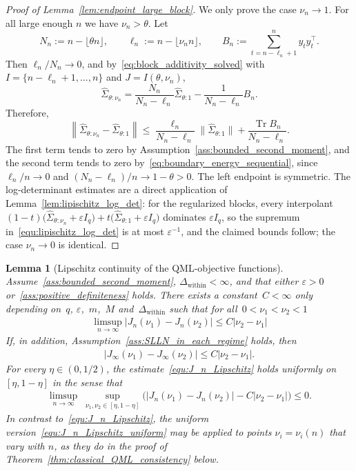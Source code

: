 \documentclass[10pt, letterpaper]{amsart}
\DeclareMathOperator{\Tr}{Tr}
\newtheorem{lem}[theorem]{Lemma}
\begin{document}
\begin{proof}[Proof of Lemma~\ref{lem:endpoint_large_block}]
We only prove the case $\nu_n\to1$. For all large enough $n$ we have $\nu_n>\theta$. Let
\[
N_n:=n-\lfloor \theta n\rfloor,\qquad
 \ell_n:=n-\lfloor \nu_n n\rfloor,
\qquad
B_n:=\sum_{t=n-\ell_n+1}^{n}y_t y_t^{\top}.
\]
Then $\ell_n/N_n\to0$, and  by~\eqref{eq:block_additivity_solved} with $I=\{n-\ell_n+1,\ldots,n\}$ and $J=I(\theta,\nu_n)$,
\[
\widehat\Sigma_{\theta:\nu_n}
=\frac{N_n}{N_n-\ell_n}\widehat\Sigma_{\theta:1}
-\frac{1}{N_n-\ell_n}B_n .
\]
Therefore,
\[
\left\|\widehat\Sigma_{\theta:\nu_n}-\widehat\Sigma_{\theta:1}\right\|
\leq
\frac{\ell_n}{N_n-\ell_n}\|\widehat\Sigma_{\theta:1}\|
+\frac{\Tr B_n}{N_n-\ell_n}.
\]
The first term tends to zero by Assumption~\ref{ass:bounded_second_moment}, and the second term tends to zero by~\eqref{eq:boundary_energy_sequential}, since $\ell_n/n\to0$ and $(N_n-\ell_n)/n\to1-\theta>0$. The left endpoint is symmetric.
The log-determinant estimates are a direct application of Lemma~\ref{lem:lipischitz_log_det}: for the regularized blocks, every interpolant $(1-t)\bigl(\widehat\Sigma_{\theta:\nu_n}+\varepsilon I_q\bigr)+t\bigl(\widehat\Sigma_{\theta:1}+\varepsilon I_q\bigr)$ dominates $\varepsilon I_q$, so the supremum in~\eqref{equ:lipischitz_log_det} is at most $\varepsilon^{-1}$, and the claimed bounds follow; the case $\nu_n\to0$ is identical.
\end{proof}

\begin{lem}[Lipschitz continuity of the QML-objective functions]\label{lem:Lipschitz_J}
Assume~\ref{ass:bounded_second_moment},
$\Delta_{\mathrm{within}}<\infty$, and that either $\varepsilon>0$
or~\ref{ass:positive_definiteness} holds.
There exists a constant~$C <\infty$ only depending on~$q$, $\varepsilon$,~$m$,~$M$ and~$\Delta_{\text{within}}$ such that for all~$0 < \nu_1 < \nu_2 <1$
\begin{align}\label{equ:J_n_Lipschitz}
    \limsup_{n \to \infty}|J_n(\nu_1) - J_n(\nu_2)| \leq C |\nu_2 - \nu_1|
\end{align}
If, in addition, Assumption~\ref{ass:SLLN_in_each_regime} holds, then
\begin{align}\label{equ:J_infty_Lipschitz}
    |J_\infty(\nu_1) - J_\infty(\nu_2)| \leq C |\nu_2 - \nu_1|.
\end{align}
For every $\eta\in(0,1/2)$, the estimate~\eqref{equ:J_n_Lipschitz} holds uniformly on $[\eta,1-\eta]$ in the sense that
\begin{align}\label{equ:J_n_Lipschitz_uniform}
\limsup_{n\to\infty}\;
\sup_{\nu_1,\nu_2\in[\eta,1-\eta]}
\Big(|J_n(\nu_1)-J_n(\nu_2)|-C|\nu_2-\nu_1|\Big)\leq0.
\end{align}
In contrast to~\eqref{equ:J_n_Lipschitz}, the uniform version~\eqref{equ:J_n_Lipschitz_uniform} may be applied to points $\nu_i=\nu_i(n)$ that vary with $n$, as they do in the proof of Theorem~\ref{thm:classical_QML_consistency} below.
\end{lem}
\end{document}
